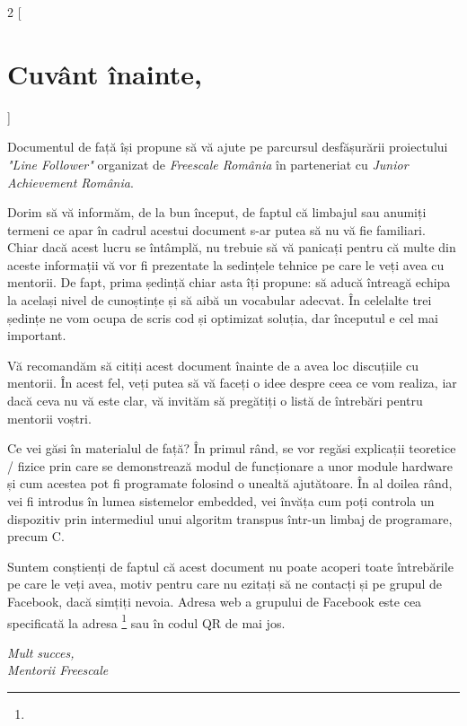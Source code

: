 \thispagestyle{empty}
\begin{multicols}{2}
[
\section*{Cuvânt înainte,}
]
\footnotesize {
Documentul de față își propune să vă ajute pe parcursul desfășurării proiectului \textit{"Line Follower"} organizat de \textit{Freescale România} în parteneriat cu \textit{Junior Achievement România}.

Dorim să vă informăm, de la bun început, de faptul că limbajul sau anumiți termeni ce apar în cadrul acestui document s-ar putea să nu vă fie familiari. Chiar dacă acest lucru se întâmplă, nu trebuie să vă panicați pentru că multe din aceste informații vă vor fi prezentate la sedințele tehnice pe care le veți avea cu mentorii. De fapt, prima ședință chiar asta îți propune: să aducă întreagă echipa la același nivel de cunoștințe și să aibă un vocabular adecvat. În celelalte trei ședințe ne vom ocupa de scris cod și optimizat soluția, dar începutul e cel mai important.

Vă recomandăm să citiți acest document înainte de a avea loc discuțiile cu mentorii. În acest fel, veți putea să vă faceți o idee despre ceea ce vom realiza, iar dacă ceva nu vă este clar, vă invităm să pregătiți o listă de întrebări pentru mentorii voștri.

Ce vei găsi în materialul de față? În primul rând, se vor regăsi explicații teoretice / fizice prin care se demonstrează modul de funcționare a unor module hardware și cum acestea pot fi programate folosind o unealtă ajutătoare. În al doilea rând, vei fi introdus în lumea sistemelor embedded, vei învăța cum poți controla un dispozitiv prin intermediul unui algoritm transpus într-un limbaj de programare, precum C.

Suntem conștienți de faptul că acest document nu poate acoperi toate întrebările pe care le veți avea, motiv pentru care nu ezitați să ne contacți și pe grupul de Facebook, dacă simțiți nevoia. Adresa web a grupului de Facebook este cea specificată la adresa \footnote{} sau în codul QR de mai jos.

}
\end{multicols}
\begin{flushright}\textit{Mult succes,\\Mentorii Freescale}\end{flushright}

\vspace{1cm}

\begin{center}
\end{center}

\restoregeometry